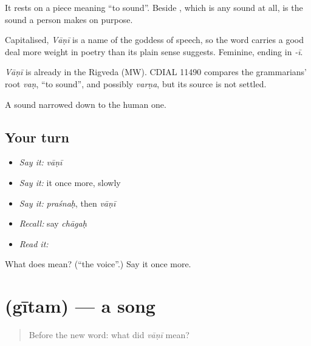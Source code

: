 It rests on a piece meaning \textquotedblleft{}to sound\textquotedblright{}. Beside , which is any sound at all, \textbf{} is the sound a person makes on purpose.

Capitalised, \emph{Vāṇī} is a name of the goddess of speech, so the word carries a good deal more weight in poetry than its plain sense suggests. Feminine, ending in \emph{-ī}.

\begin{cousinweb}
\emph{Vāṇī} is already in the Rigveda (MW). CDIAL 11490 compares the grammarians' root \emph{vaṇ}, \textquotedblleft{}to sound\textquotedblright{}, and possibly \emph{varṇa}, but its source is not settled.
\end{cousinweb}

\begin{grammarlens}[title={What you've built}]
A sound narrowed down to the human one.
\end{grammarlens}

\subsection*{Your turn}
\begin{itemize}
\raggedright
  \item \emph{Say it:} \emph{vāṇī}
  \item \emph{Say it:} it once more, slowly
  \item \emph{Say it:} \emph{praśnaḥ}, then \emph{vāṇī}
  \item \emph{Recall:} say \emph{chāgaḥ}
  \item \emph{Read it:} \textbf{}
\end{itemize}

\begin{tcolorbox}[breakable,colback=teal!4,colframe=teal!35!black,title={Before you move on}]
What does  mean? (\textquotedblleft{}the voice\textquotedblright{}.) Say it once more.
\end{tcolorbox}
\section[\texorpdfstring{\sk{गीतम्} (gītam)}{गीतम् (gītam)}]{ (gītam) — a song}

\label{lesson:SA-C50-song}



\begin{quote}
Before the new word: what did \emph{vāṇī} mean?
\end{quote}


